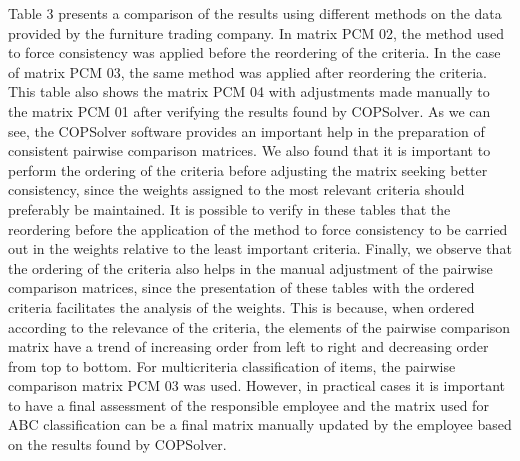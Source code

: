 \documentclass[10pt,fleqn,a4paper,twoside]{article}
\begin{document}
Table 3 presents a comparison of the results using different methods on the data provided by the furniture trading company. In matrix PCM 02, the method used to force consistency was applied before the reordering of the criteria. In the case of matrix PCM 03, the same method was applied after reordering the criteria. This table also shows the matrix PCM 04 with adjustments made manually to the matrix PCM 01 after verifying the results found by COPSolver. As we can see, the COPSolver software provides an important help in the preparation of consistent pairwise comparison matrices. We also found that it is important to perform the ordering of the criteria before adjusting the matrix seeking better consistency, since the weights assigned to the most relevant criteria should preferably be maintained. It is possible to verify in these tables that the reordering before the application of the method to force consistency to be carried out in the weights relative to the least important criteria. Finally, we observe that the ordering of the criteria also helps in the manual adjustment of the pairwise comparison matrices, since the presentation of these tables with the ordered criteria facilitates the analysis of the weights. This is because, when ordered according to the relevance of the criteria, the elements of the pairwise comparison matrix have a trend of increasing order from left to right and decreasing order from top to bottom. For multicriteria classification of items, the pairwise comparison matrix PCM 03 was used. However, in practical cases it is important to have a final assessment of the responsible employee and the matrix used for ABC classification can be a final matrix manually updated by the employee based on the results found by COPSolver.
	
\end{document}
